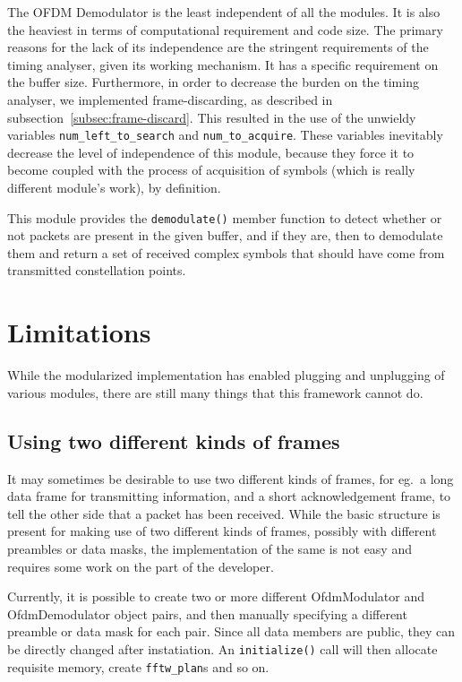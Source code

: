 The OFDM Demodulator is the least independent of all the modules. It is also
the heaviest in terms of computational requirement and code size. The primary
reasons for the lack of its independence are the stringent requirements of the
timing analyser, given its working mechanism. It has a specific requirement on
the buffer size. Furthermore, in order to decrease the burden on the timing
analyser, we implemented frame-discarding, as described in
subsection~\ref{subsec:frame-discard}. This resulted in the use of the
unwieldy variables \lstinline!num_left_to_search! and
\lstinline!num_to_acquire!. These variables inevitably decrease the level of
independence of this module, because they force it to become coupled with the
process of acquisition of symbols (which is really different module's work), by
definition.

This module provides the \lstinline!demodulate()! member function to detect
whether or not packets are present in the given buffer, and if they are, then
to demodulate them and return a set of received complex symbols that should
have come from transmitted constellation points.


\section{Limitations}

While the modularized implementation has enabled plugging and unplugging of
various modules, there are still many things that this framework cannot do.

\subsection{Using two different kinds of frames}

It may sometimes be desirable to use two different kinds of frames, for eg.\ a
long data frame for transmitting information, and a short acknowledgement
frame, to tell the other side that a packet has been received. While the basic
structure is present for making use of two different kinds of frames, possibly
with different preambles or data masks, the implementation of the same is not
easy and requires some work on the part of the developer.

Currently, it is possible to create two or more different OfdmModulator and
OfdmDemodulator object pairs, and then manually specifying a different preamble
or data mask for each pair. Since all data members are public, they can be
directly changed after instatiation. An \lstinline!initialize()! call will then
allocate requisite memory, create \lstinline!fftw_plan!s and so on.

